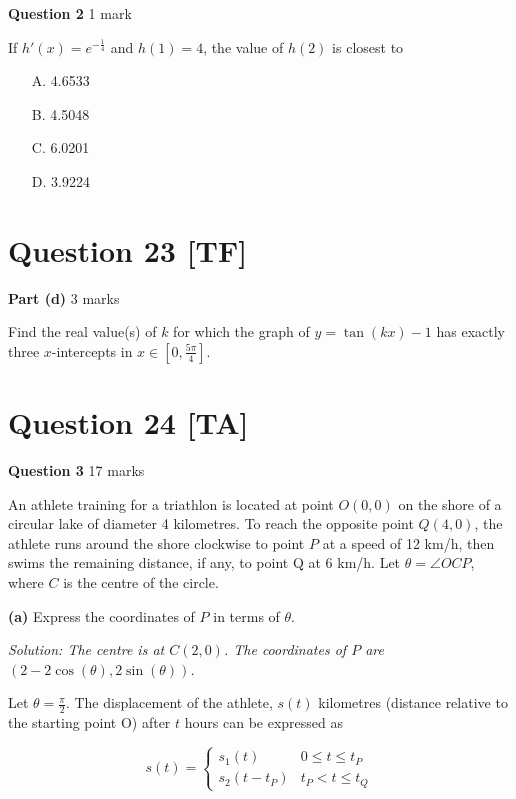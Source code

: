 \documentclass[12pt,a4paper]{article}
\begin{document}
\textbf{Question 2} \hfill 1 mark

If $h'(x) = e^{-\frac{1}{4}}$ and $h(1) = 4$, the value of $h(2)$ is closest to

\begin{enumerate}
    \item[A.] 4.6533
    \item[B.] 4.5048
    \item[C.] 6.0201
    \item[D.] 3.9224
\end{enumerate}

\vspace{5\baselineskip}

\section*{Question 23 [TF]}

\textbf{Part (d)} \hfill 3 marks

Find the real value(s) of $k$ for which the graph of $y = \tan(kx) - 1$ has exactly three $x$-intercepts in $x \in \left[0, \frac{5\pi}{4}\right]$.

\vspace{5\baselineskip}

\section*{Question 24 [TA]}

\textbf{Question 3} \hfill 17 marks

An athlete training for a triathlon is located at point $O(0,0)$ on the shore of a circular lake of diameter 4 kilometres. To reach the opposite point $Q(4,0)$, the athlete runs around the shore clockwise to point $P$ at a speed of 12 km/h, then swims the remaining distance, if any, to point Q at 6 km/h. Let $\theta = \angle OCP$, where $C$ is the centre of the circle.

\textbf{(a)} Express the coordinates of $P$ in terms of $\theta$.

\textit{Solution: The centre is at $C(2,0)$. The coordinates of $P$ are $(2 - 2\cos(\theta), 2\sin(\theta))$.
}

\vspace{5\baselineskip}

Let $\theta = \frac{\pi}{2}$. The displacement of the athlete, $s(t)$ kilometres (distance relative to the starting point O) after $t$ hours can be expressed as

\[
s(t) = \begin{cases}
s_1(t) & 0 \leq t \leq t_P\\
s_2(t - t_P) & t_P < t \leq t_Q
\end{cases}
\]
\end{document}
